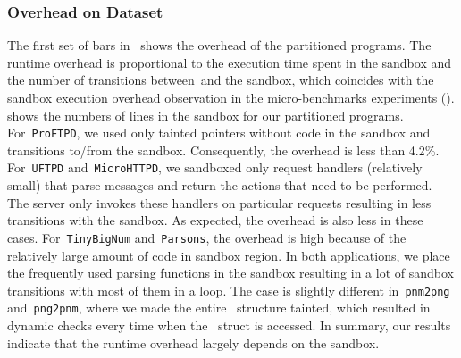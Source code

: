 \subsubsection{Overhead on Dataset}
\label{subsec:programoverhead}


%
The first set of bars in~ shows the overhead of the partitioned programs.
The runtime overhead is proportional to the execution time 
spent in the sandbox and the number of transitions between~\cregion and the sandbox,
which coincides with the sandbox execution overhead observation in the micro-benchmarks experiments ().
 shows the numbers of lines in the sandbox for our partitioned programs.
For~\texttt{ProFTPD}, we used only tainted pointers without code in the sandbox and transitions to/from the sandbox.
Consequently, the overhead is less than 4.2\%.
For~\texttt{UFTPD} and~\texttt{MicroHTTPD}, we sandboxed only request handlers (relatively small)
that parse messages and return the actions that need to be performed.
The server only invokes these handlers on particular requests resulting in less transitions with the sandbox.
As expected, the overhead is also less in these cases.
For~\texttt{TinyBigNum} and~\texttt{Parsons}, the overhead is high because of the relatively large amount of code in sandbox region.
In both applications, we place the frequently used parsing functions in the sandbox 
resulting in a lot of sandbox transitions with most of them in a loop.
The case is slightly different in~\texttt{pnm2png} and~\texttt{png2pnm},
where we made the entire~ structure tainted, 
which resulted in dynamic checks every time when the~ struct is accessed.
In summary, our results indicate that the runtime overhead largely depends on the sandbox.

